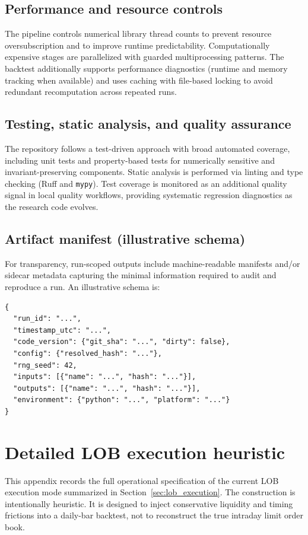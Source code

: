 \documentclass[11pt,a4paper]{article}
\begin{document}
\subsection*{Performance and resource controls}
The pipeline controls numerical library thread counts to prevent resource
oversubscription and to improve runtime predictability. Computationally
expensive stages are parallelized with guarded multiprocessing patterns. The
backtest additionally supports performance diagnostics (runtime and memory
tracking when available) and uses caching with file-based locking to avoid
redundant recomputation across repeated runs.

\subsection*{Testing, static analysis, and quality assurance}
The repository follows a test-driven approach with broad automated coverage,
including unit tests and property-based tests for numerically sensitive and
invariant-preserving components. Static analysis is performed via linting and
type checking (Ruff and \texttt{mypy}). Test coverage is monitored as an
additional quality signal in local quality workflows, providing systematic
regression diagnostics as the research code evolves.

\subsection*{Artifact manifest (illustrative schema)}
For transparency, run-scoped outputs include machine-readable manifests and/or
sidecar metadata capturing the minimal information required to audit and
reproduce a run. An illustrative schema is:

\begin{verbatim}
{
  "run_id": "...",
  "timestamp_utc": "...",
  "code_version": {"git_sha": "...", "dirty": false},
  "config": {"resolved_hash": "..."},
  "rng_seed": 42,
  "inputs": [{"name": "...", "hash": "..."}],
  "outputs": [{"name": "...", "hash": "..."}],
  "environment": {"python": "...", "platform": "..."}
}
\end{verbatim}

\section{Detailed LOB execution heuristic}\label{app:lob_execution_details}

This appendix records the full operational specification of the current LOB
execution mode summarized in Section~\ref{sec:lob_execution}. The construction
is intentionally heuristic. It is designed to inject conservative liquidity and
timing frictions into a daily-bar backtest, not to reconstruct the true
intraday limit order book.
\end{document}
